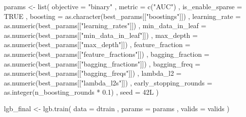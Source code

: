 \documentclass[
]{article}
\newenvironment{Shaded}{\begin{snugshade}}{\end{snugshade}}
\newcommand{\AttributeTok}[1]{\textcolor[rgb]{0.77,0.63,0.00}{#1}}
\newcommand{\ConstantTok}[1]{\textcolor[rgb]{0.00,0.00,0.00}{#1}}
\newcommand{\FloatTok}[1]{\textcolor[rgb]{0.00,0.00,0.81}{#1}}
\newcommand{\FunctionTok}[1]{\textcolor[rgb]{0.00,0.00,0.00}{#1}}
\newcommand{\NormalTok}[1]{#1}
\newcommand{\OtherTok}[1]{\textcolor[rgb]{0.56,0.35,0.01}{#1}}
\newcommand{\SpecialCharTok}[1]{\textcolor[rgb]{0.00,0.00,0.00}{#1}}
\newcommand{\StringTok}[1]{\textcolor[rgb]{0.31,0.60,0.02}{#1}}
\begin{document}
\begin{Shaded}
\begin{Highlighting}[]
\NormalTok{params }\OtherTok{\textless{}{-}} \FunctionTok{list}\NormalTok{(}
    \AttributeTok{objective =} \StringTok{"binary"}
\NormalTok{    , }\AttributeTok{metric =} \FunctionTok{c}\NormalTok{(}\StringTok{"AUC"}\NormalTok{)  }
\NormalTok{    , }\AttributeTok{is\_enable\_sparse =} \ConstantTok{TRUE}
\NormalTok{    , }\AttributeTok{boosting =} \FunctionTok{as.character}\NormalTok{(best\_params[[}\StringTok{"boostings"}\NormalTok{]])}
\NormalTok{    , }\AttributeTok{learning\_rate =} \FunctionTok{as.numeric}\NormalTok{(best\_params[[}\StringTok{"learning\_rates"}\NormalTok{]])}
\NormalTok{    , }\AttributeTok{min\_data\_in\_leaf =} \FunctionTok{as.numeric}\NormalTok{(best\_params[[}\StringTok{"min\_data\_in\_leaf"}\NormalTok{]])}
\NormalTok{    , }\AttributeTok{max\_depth =} \FunctionTok{as.numeric}\NormalTok{(best\_params[[}\StringTok{"max\_depth"}\NormalTok{]])}
\NormalTok{    , }\AttributeTok{feature\_fraction =} \FunctionTok{as.numeric}\NormalTok{(best\_params[[}\StringTok{"feature\_fractions"}\NormalTok{]])}
\NormalTok{    , }\AttributeTok{bagging\_fraction =} \FunctionTok{as.numeric}\NormalTok{(best\_params[[}\StringTok{"bagging\_fractions"}\NormalTok{]])}
\NormalTok{    , }\AttributeTok{bagging\_freq =} \FunctionTok{as.numeric}\NormalTok{(best\_params[[}\StringTok{"bagging\_freqs"}\NormalTok{]])}
\NormalTok{    , }\AttributeTok{lambda\_l2 =} \FunctionTok{as.numeric}\NormalTok{(best\_params[[}\StringTok{"lambda\_l2s"}\NormalTok{]])}
\NormalTok{    , }\AttributeTok{early\_stopping\_rounds =} \FunctionTok{as.integer}\NormalTok{(n\_boosting\_rounds }\SpecialCharTok{*} \FloatTok{0.1}\NormalTok{)}
\NormalTok{    , }\AttributeTok{seed =}\NormalTok{ 42L}
\NormalTok{)}

\NormalTok{lgb\_final }\OtherTok{\textless{}{-}} \FunctionTok{lgb.train}\NormalTok{(}
    \AttributeTok{data =}\NormalTok{ dtrain}
\NormalTok{    , }\AttributeTok{params =}\NormalTok{ params}
\NormalTok{    , }\AttributeTok{valids =}\NormalTok{ valids}
\NormalTok{)}
\end{Highlighting}
\end{Shaded}
\end{document}
